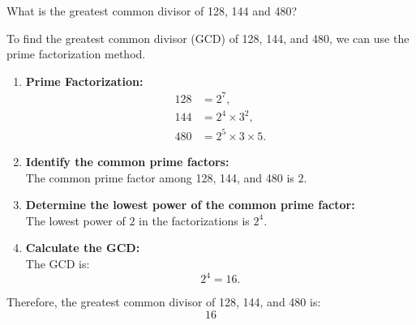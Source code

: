\begin{figure*}[htbp]
    \centering
\begin{tcolorbox}[title=Problem, promptstyle]
\lstset{
    basicstyle=\normalfont\sffamily\footnotesize,
    breaklines=true,
    frame=none,
    columns=fullflexible,
}
What is the greatest common divisor of 128, 144 and 480?
\end{tcolorbox}
    
\end{figure*}



\begin{figure*}[htbp]
    \centering
\begin{tcolorbox}[title=Large Teacher CoT Example, promptstyle]
\lstset{
    basicstyle=\normalfont\sffamily\footnotesize,
    breaklines=true,
    frame=none,
    columns=fullflexible,
}
To find the greatest common divisor (GCD) of 128, 144, and 480, we can use the prime factorization method.

\begin{enumerate}
    \item \textbf{Prime Factorization:}
    \begin{align*}
        128 &= 2^7, \\
        144 &= 2^4 \times 3^2, \\
        480 &= 2^5 \times 3 \times 5.
    \end{align*}

    \item \textbf{Identify the common prime factors:}\\
    The common prime factor among 128, 144, and 480 is \(2\).

    \item \textbf{Determine the lowest power of the common prime factor:}\\
    The lowest power of \(2\) in the factorizations is \(2^4\).

    \item \textbf{Calculate the GCD:}\\
    The GCD is:
    \[
    2^4 = 16.
    \]
\end{enumerate}

Therefore, the greatest common divisor of 128, 144, and 480 is:
\[
\boxed{16}
\]
\end{tcolorbox}
    
\end{figure*}


